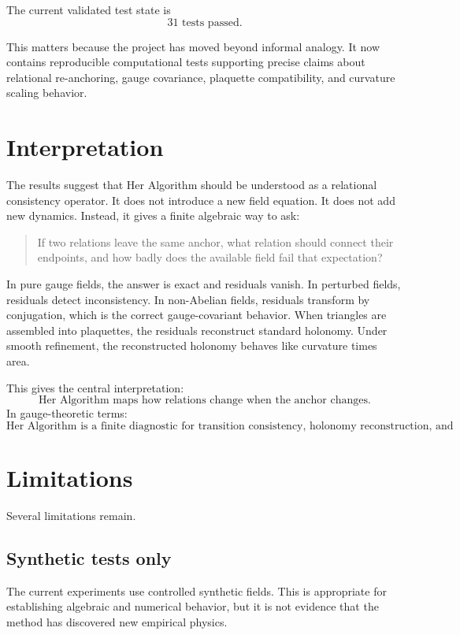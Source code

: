 \documentclass[11pt]{article}
\newcommand{\HA}{Her Algorithm}
\begin{document}
The current validated test state is
\[
\boxed{31\text{ tests passed}.}
\]

This matters because the project has moved beyond informal analogy.  It now contains reproducible computational tests supporting precise claims about relational re-anchoring, gauge covariance, plaquette compatibility, and curvature scaling behavior.

\section{Interpretation}

The results suggest that \HA{} should be understood as a relational consistency operator.  It does not introduce a new field equation.  It does not add new dynamics.  Instead, it gives a finite algebraic way to ask:
\begin{quote}
If two relations leave the same anchor, what relation should connect their endpoints, and how badly does the available field fail that expectation?
\end{quote}

In pure gauge fields, the answer is exact and residuals vanish.  In perturbed fields, residuals detect inconsistency.  In non-Abelian fields, residuals transform by conjugation, which is the correct gauge-covariant behavior.  When triangles are assembled into plaquettes, the residuals reconstruct standard holonomy.  Under smooth refinement, the reconstructed holonomy behaves like curvature times area.

This gives the central interpretation:
\[
\boxed{\text{\HA{} maps how relations change when the anchor changes.}}
\]
In gauge-theoretic terms:
\[
\boxed{\text{\HA{} is a finite diagnostic for transition consistency, holonomy reconstruction, and curvature-compatible scaling.}}
\]

\section{Limitations}

Several limitations remain.

\subsection{Synthetic tests only}
The current experiments use controlled synthetic fields.  This is appropriate for establishing algebraic and numerical behavior, but it is not evidence that the method has discovered new empirical physics.
\end{document}
